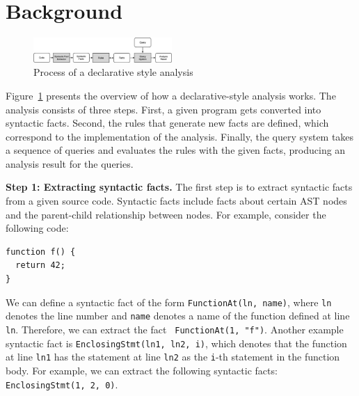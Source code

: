 \section{Background}\label{sec:background} 
\begin{figure}[t]
  \centering
  \vspace{2mm}
  \includegraphics[width=0.47\textwidth]{img/ov1.png}
  \caption{Process of a declarative style analysis}
  \label{fig:ov1}
\end{figure}

Figure~\ref{fig:ov1} presents the overview of how a declarative-style
analysis works.  The analysis consists of three steps.  First, a given program
gets converted into syntactic facts.  Second, the rules that generate new facts
are defined, which correspond to the implementation of the analysis.  Finally,
the query system takes a sequence of queries and evaluates the rules with the
given facts, producing an analysis result for the queries.


\textbf{Step 1: Extracting syntactic facts.}
The first step is to extract syntactic facts from a given source code.
Syntactic facts include facts about certain AST nodes and
the parent-child relationship between nodes. For example, consider
the following code:

\begin{lstlisting}[style=mcpp]
function f() {
  return 42;
}
\end{lstlisting}
We can define a syntactic fact of the form {\tt FunctionAt(ln, name)}, where
{\tt ln} denotes the line number and {\tt name} denotes a name of the function
defined at line {\tt ln}.  Therefore, we can extract the fact {\tt
FunctionAt(1, "f")}.  Another example syntactic fact is {\tt EnclosingStmt(ln1,
ln2, i)}, which denotes that the function at line {\tt ln1} has the statement
at line {\tt ln2} as the {\tt i}-th statement in the function body.  For
example, we can extract the following syntactic facts: {\tt EnclosingStmt(1, 2,
0)}.

